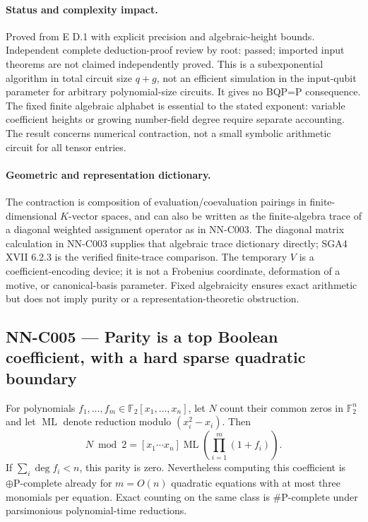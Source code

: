 \paragraph{Status and complexity impact.}
Proved from E D.1 with explicit precision and algebraic-height bounds. Independent complete deduction-proof review by root: passed; imported input theorems are not claimed independently proved. This is a subexponential algorithm in total circuit size $q+g$, not an efficient simulation in the input-qubit parameter for arbitrary polynomial-size circuits. It gives no BQP=P consequence. The fixed finite algebraic alphabet is essential to the stated exponent: variable coefficient heights or growing number-field degree require separate accounting. The result concerns numerical contraction, not a small symbolic arithmetic circuit for all tensor entries.

\paragraph{Geometric and representation dictionary.}
The contraction is composition of evaluation/coevaluation pairings in finite-dimensional $K$-vector spaces, and can also be written as the finite-algebra trace of a diagonal weighted assignment operator as in NN-C003. The diagonal matrix calculation in NN-C003 supplies that algebraic trace dictionary directly; SGA4 XVII 6.2.3 is the verified finite-trace comparison. The temporary $V$ is a coefficient-encoding device; it is not a Frobenius coordinate, deformation of a motive, or canonical-basis parameter. Fixed algebraicity ensures exact arithmetic but does not imply purity or a representation-theoretic obstruction.

\subsection{NN-C005 --- Parity is a top Boolean coefficient, with a hard sparse quadratic boundary}
\begin{proposition}[NN-C005]
For polynomials $f_1,\ldots,f_m\in\mathbb F_2[x_1,\ldots,x_n]$, let $N$ count their common zeros in $\mathbb F_2^n$ and let $\operatorname{ML}$ denote reduction modulo $(x_i^2-x_i)$. Then
\[
 N\bmod2=[x_1\cdots x_n]\operatorname{ML}\!\left(\prod_{i=1}^m(1+f_i)\right).
\]
If $\sum_i\deg f_i<n$, this parity is zero. Nevertheless computing this coefficient is $\oplus\mathrm P$-complete already for $m=O(n)$ quadratic equations with at most three monomials per equation. Exact counting on the same class is $\#\mathrm P$-complete under parsimonious polynomial-time reductions.
\end{proposition}
